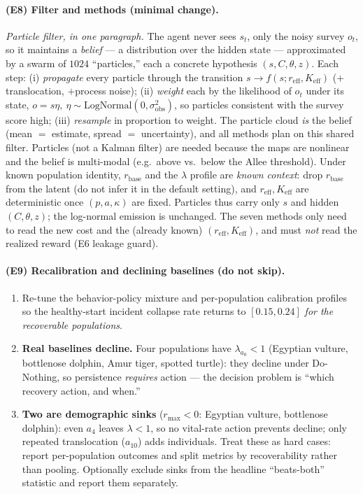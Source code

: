 \documentclass[11pt]{article}
\newcommand{\reff}{r_{\mathrm{eff}}}
\newcommand{\Keff}{K_{\mathrm{eff}}}
\newcommand{\rbase}{r_{\mathrm{base}}}
\newcommand{\rmax}{r_{\max}}
\newcommand{\sobs}{\sigma_{\mathrm{obs}}}
\begin{document}
\paragraph{(E8) Filter and methods (minimal change).}
\emph{Particle filter, in one paragraph.} The agent never sees $s_t$, only the noisy
survey $o_t$, so it maintains a \emph{belief} --- a distribution over the hidden state
--- approximated by a swarm of $1024$ ``particles,'' each a concrete hypothesis
$(s,C,\theta,z)$. Each step: (i) \emph{propagate} every particle through the transition
$s\!\to\!f(s;\reff,\Keff)$ ($+$translocation, $+$process noise); (ii) \emph{weight}
each by the likelihood of $o_t$ under its state, $o{=}s\eta,\
\eta\sim\mathrm{LogNormal}(0,\sobs^2)$, so particles consistent with the survey score
high; (iii) \emph{resample} in proportion to weight. The particle cloud \emph{is} the
belief (mean $=$ estimate, spread $=$ uncertainty), and all methods plan on this shared
filter. Particles (not a Kalman filter) are needed because the maps are nonlinear and
the belief is multi-modal (e.g.\ above vs.\ below the Allee threshold).
Under known population identity, $\rbase$ and the $\lambda$ profile are \emph{known
context}: drop $\rbase$ from the latent (do not infer it in the default setting), and
$\reff,\Keff$ are deterministic once $(p,a,\kappa)$ are fixed. Particles thus carry
only $s$ and hidden $(C,\theta,z)$; the log-normal emission is unchanged. The seven
methods only need to read the new cost and the (already known) $(\reff,\Keff)$, and
must \emph{not} read the realized reward (E6 leakage guard).

\paragraph{(E9) Recalibration and declining baselines (do not skip).}
\begin{enumerate}[leftmargin=1.8em,nosep]
\item Re-tune the behavior-policy mixture and per-population calibration profiles so
the healthy-start incident collapse rate returns to $[0.15,0.24]$ \emph{for the
recoverable populations}.
\item \textbf{Real baselines decline.} Four populations have $\lambda_{a_0}<1$
(Egyptian vulture, bottlenose dolphin, Amur tiger, spotted turtle): they decline
under Do-Nothing, so persistence \emph{requires} action --- the decision problem is
``which recovery action, and when.''
\item \textbf{Two are demographic sinks} ($\rmax<0$: Egyptian vulture, bottlenose
dolphin): even $a_4$ leaves $\lambda<1$, so no vital-rate action prevents decline;
only repeated translocation ($a_{10}$) adds individuals. Treat these as hard cases:
report per-population outcomes and split metrics by recoverability rather than
pooling. Optionally exclude sinks from the headline ``beats-both'' statistic and
report them separately.
\end{enumerate}
\end{document}

